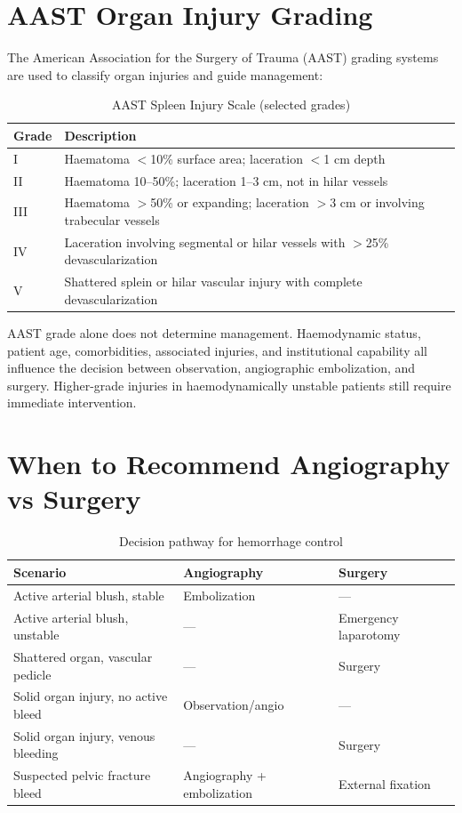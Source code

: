 \section{AAST Organ Injury Grading}
The American Association for the Surgery of Trauma (AAST) grading systems are used to classify organ injuries and guide management:

\begin{table}[h]
\centering
\caption{AAST Spleen Injury Scale (selected grades)}
\begin{tabular}{|p{}|p{}|}
\hline
\textbf{Grade} & \textbf{Description} \\
\hline
I & Haematoma $<$10\% surface area; laceration $<$1 cm depth \\
II & Haematoma 10--50\%; laceration 1--3 cm, not in hilar vessels \\
III & Haematoma $>$50\% or expanding; laceration $>$3 cm or involving trabecular vessels \\
IV & Laceration involving segmental or hilar vessels with $>$25\% devascularization \\
V & Shattered splein or hilar vascular injury with complete devascularization \\
\hline
\end{tabular}
\end{table}

\begin{pearlbox}
AAST grade alone does not determine management. Haemodynamic status, patient age, comorbidities, associated injuries, and institutional capability all influence the decision between observation, angiographic embolization, and surgery. Higher-grade injuries in haemodynamically unstable patients still require immediate intervention.
\end{pearlbox}

\section{When to Recommend Angiography vs Surgery}

\begin{table}[h]
\centering
\caption{Decision pathway for hemorrhage control}
\begin{tabular}{|p{}|p{}|p{}|}
\hline
\textbf{Scenario} & \textbf{Angiography} & \textbf{Surgery} \\
\hline
Active arterial blush, stable & Embolization & --- \\
Active arterial blush, unstable & --- & Emergency laparotomy \\
Shattered organ, vascular pedicle & --- & Surgery \\
Solid organ injury, no active bleed & Observation/angio & --- \\
Solid organ injury, venous bleeding & --- & Surgery \\
Suspected pelvic fracture bleed & Angiography + embolization & External fixation \\
\hline
\end{tabular}
\end{table}

